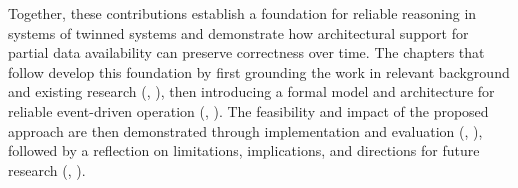 \vspace{1em}
Together, these contributions establish a foundation for reliable reasoning in systems of twinned systems and demonstrate how architectural support for partial data availability can preserve correctness over time. The chapters that follow develop this foundation by first grounding the work in relevant background and existing research (, ), then introducing a formal model and architecture for reliable event-driven operation (, ). The feasibility and impact of the proposed approach are then demonstrated through implementation and evaluation (, ), followed by a reflection on limitations, implications, and directions for future research (, ).

